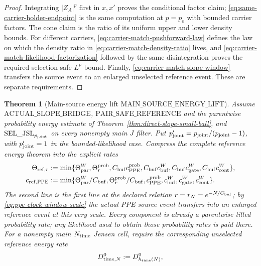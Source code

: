 \documentclass[11pt]{article}
\newtheorem{theorem}{Theorem}[section]
\begin{document}
\begin{proof}
Integrating $|Z_A|^p$ first in $x,x'$ proves the conditional factor claim;
\eqref{eq:same-carrier-holder-endpoint} is the same computation at
$p=p_o$ with bounded carrier factors.  The cone claim is the ratio of its
uniform upper and lower density bounds.  For different carriers,
\eqref{eq:carrier-match-pushforward-law} defines the law on which the density
ratio in \eqref{eq:carrier-match-density-ratio} lives, and
\eqref{eq:carrier-match-likelihood-factorization} followed by the same
disintegration proves the required selection-safe $L^p$ bound.  Finally,
\eqref{eq:carrier-match-slope-window} transfers the source event to an
enlarged unselected reference event.  These are separate requirements.
\end{proof}

\begin{theorem}[Main-source energy lift
$\mathrm{MAIN\_SOURCE\_ENERGY\_LIFT}$]
\label{thm:main-source-energy-lift}
Assume $\mathrm{ACTUAL\_SLOPE\_BRIDGE}$,
$\mathrm{PAIR\_SAFE\_REFERENCE}$ and the parentwise probability energy estimate of
Theorem~\ref{thm:direct-slope-small-ball}, and
$\mathrm{SEL\_JSL}_{p_{\rm joint}}$ on every nonempty main $J$ filter.  Put
$p_{\rm joint}'=p_{\rm joint}/(p_{\rm joint}-1)$, with
$p_{\rm joint}'=1$ in the bounded-likelihood case.  Compress the complete
reference energy theorem into the explicit rates
\begin{align}
 \Theta_{{\rm ref},r}:=\min\{&\Theta_{\rm par}^{W},
  \Theta_r^{\rm prob},C_{\rm buf}c_{\rm PPE}^{\rm prob},
  C_{\rm buf}c_{\rm buf}^{W},C_{\rm buf}c_{\rm gate}^{W},
  C_{\rm buf}c_{\rm cont}^{W}\},\notag\\
 c_{{\rm ref},{\rm PPE}}:=\min\{&\Theta_{\rm par}^{W}/C_{\rm buf},
  \Theta_r^{\rm prob}/C_{\rm buf},c_{\rm PPE}^{\rm prob},
  c_{\rm buf}^{W},c_{\rm gate}^{W},c_{\rm cont}^{W}\}.
 \label{eq:explicit-reference-energy-rates}
\end{align}
The second line is the first line at the declared relation
$r=r_N=e^{-N/C_{\rm buf}}$; by
\eqref{eq:ppe-clock-window-scale} the actual PPE source event transfers into
an enlarged reference event at this very scale.  Every component is already a parentwise
tilted probability rate; any likelihood used to obtain those probability
rates is paid there.  For a nonempty main $N_{\rm time}$ Jensen cell, require
the corresponding \emph{unselected} reference energy rate
\begin{equation}
\label{eq:unselected-time-reference-energy}
 D_{{\rm time},N}^{0}:=D_{h_{\rm time}(N)}^0,

\end{equation}
\end{theorem}
\end{document}
